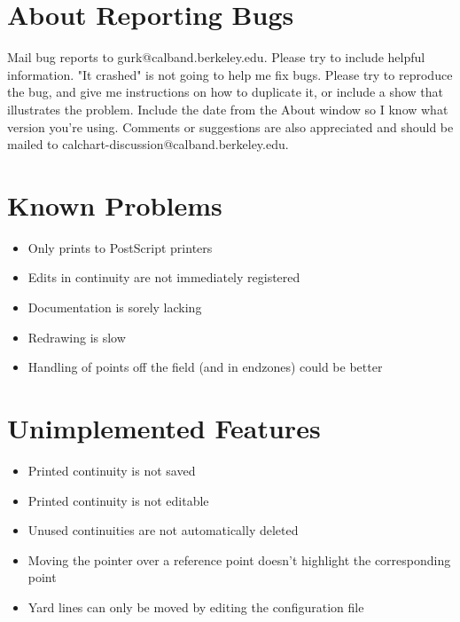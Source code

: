 \section{About Reporting Bugs}\label{reportingbugs}

Mail bug reports to gurk@calband.berkeley.edu.  Please try to include
helpful information.  "It crashed" is not going to help me fix bugs.
Please try to reproduce the bug, and give me instructions on how to
duplicate it, or include a show that illustrates the problem.  Include
the date from the About window so I know what version you're using.  Comments
or suggestions are also appreciated and should be mailed to
calchart-discussion@calband.berkeley.edu.

\section{Known Problems}\label{problems}

\begin{itemize}\itemsep=0pt
\item Only prints to PostScript printers
\item Edits in continuity are not immediately registered
\item Documentation is sorely lacking
\item Redrawing is slow
\item Handling of points off the field (and in endzones) could be better
\end{itemize}

\section{Unimplemented Features}\label{notdone}

\begin{itemize}\itemsep=0pt
\item Printed continuity is not saved
\item Printed continuity is not editable
\item Unused continuities are not automatically deleted
\item Moving the pointer over a reference point doesn't highlight the
corresponding point
\item Yard lines can only be moved by editing the configuration file
\end{itemize}
